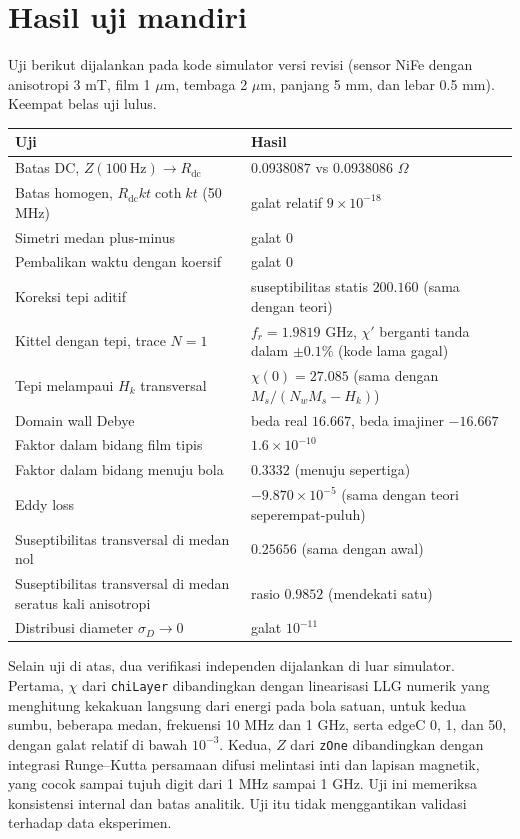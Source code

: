\documentclass[a4paper,11pt]{article}
\begin{document}
\section{Hasil uji mandiri}\label{app:uji}
Uji berikut dijalankan pada kode simulator versi revisi
(sensor NiFe dengan anisotropi 3 mT, film 1 $\mu$m, tembaga 2 $\mu$m,
panjang 5 mm, dan lebar 0.5 mm). Keempat belas uji lulus.
\begin{center}
\small
\begin{tabular}{p{}p{}}
\toprule
Uji & Hasil\\
\midrule
Batas DC, $Z(100\ \mathrm{Hz})\to R_{\mathrm{dc}}$ &
$0.0938087$ vs $0.0938086$ $\Omega$\\
Batas homogen, $R_{\mathrm{dc}}kt\coth kt$ (50 MHz) & galat relatif $9\times10^{-18}$\\
Simetri medan plus-minus & galat $0$\\
Pembalikan waktu dengan koersif & galat $0$\\
Koreksi tepi aditif & suseptibilitas statis $200.160$ (sama dengan teori)\\
Kittel dengan tepi, trace $N=1$ & $f_{r}=1.9819$ GHz, $\chi'$ berganti tanda
dalam $\pm0.1\%$ (kode lama gagal)\\
Tepi melampaui $H_{k}$ transversal & $\chi(0)=27.085$ (sama dengan
$M_{s}/(N_{w}M_{s}-H_{k})$)\\
Domain wall Debye & beda real $16.667$, beda imajiner $-16.667$\\
Faktor dalam bidang film tipis & $1.6\times10^{-10}$\\
Faktor dalam bidang menuju bola & $0.3332$ (menuju sepertiga)\\
Eddy loss & $-9.870\times10^{-5}$ (sama dengan teori seperempat-puluh)\\
Suseptibilitas transversal di medan nol & $0.25656$ (sama dengan awal)\\
Suseptibilitas transversal di medan seratus kali anisotropi &
rasio $0.9852$ (mendekati satu)\\
Distribusi diameter $\sigma_{D}\to0$ & galat $10^{-11}$\\
\bottomrule
\end{tabular}
\end{center}
Selain uji di atas, dua verifikasi independen dijalankan di luar simulator.
Pertama, $\chi$ dari \texttt{chiLayer} dibandingkan dengan linearisasi LLG
numerik yang menghitung kekakuan langsung dari energi pada bola satuan, untuk
kedua sumbu, beberapa medan, frekuensi 10 MHz dan 1 GHz, serta edgeC 0, 1, dan 50,
dengan galat relatif di bawah $10^{-3}$. Kedua, $Z$ dari \texttt{zOne}
dibandingkan dengan integrasi Runge--Kutta persamaan difusi melintasi inti dan
lapisan magnetik, yang cocok sampai tujuh digit dari 1 MHz sampai 1 GHz.
Uji ini memeriksa konsistensi internal dan batas analitik.
Uji itu tidak menggantikan validasi terhadap data eksperimen.
\end{document}
